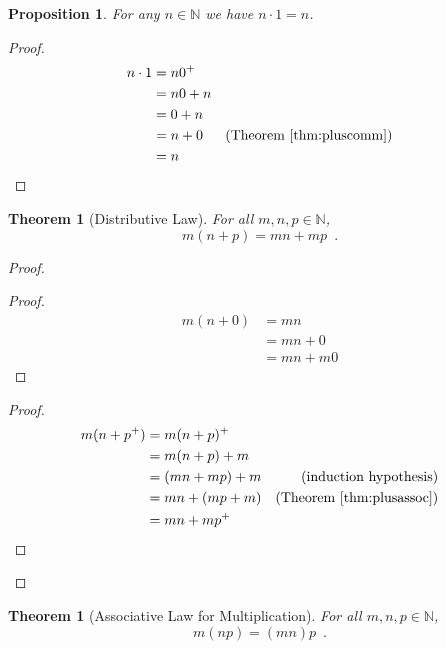\documentclass{book}
\let\qed\relax
\newtheorem{prop}[ax]{Proposition}
\newtheorem{thm}[ax]{Theorem}
\theoremstyle{definition}
\begin{document}
\begin{prop}
\label{prop:multone}
For any $n \in \mathbb{N}$ we have $n \cdot 1 = n$.
\end{prop}

\begin{proof}
\pf
\begin{align*}
	n \cdot 1 & = n 0^+ \\
	& = n0 + n \\
	& = 0 + n \\
	& = n + 0 & (\text{Theorem \ref{thm:pluscomm}}) \\
	& = n
\end{align*}
\end{proof}

\begin{thm}[Distributive Law]
For all $m,n,p \in \mathbb{N}$,
\[ m(n+p) = mn + mp \enspace . \]
\end{thm}

\begin{proof}
\pf
{}
\begin{proof}
	\pf
	\begin{align*}
		m(n+0) & = mn \\
		& = mn + 0 \\
		& = mn + m0
	\end{align*}
\end{proof}
\begin{proof}
	\pf
	\begin{align*}
		m(n+p^+) & = m(n+p)^+ \\
		& = m(n+p) + m \\
		& = (mn + mp) + m & (\text{induction hypothesis}) \\
		& = mn + (mp + m) & (\text{Theorem \ref{thm:plusassoc}}) \\
		& = mn + mp^+
	\end{align*}
\end{proof}
\qed
\end{proof}

\begin{thm}[Associative Law for Multiplication]
\label{thm:timesassoc}
For all $m,n,p \in \mathbb{N}$,
\[ m(np) = (mn)p \enspace . \]
\end{thm}
\end{document}
